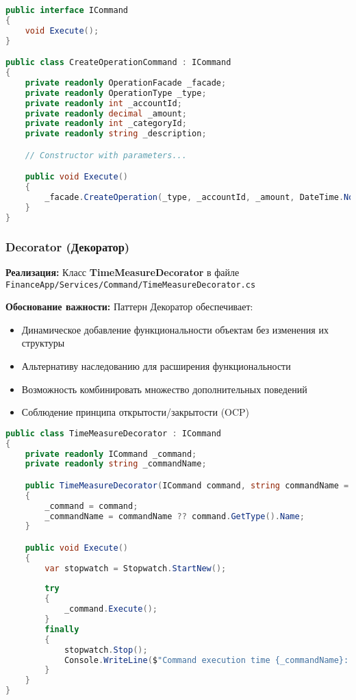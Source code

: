 \documentclass[12pt,a4paper]{article}
\begin{document}
\begin{lstlisting}[language=csharp]
public interface ICommand
{
    void Execute();
}

public class CreateOperationCommand : ICommand
{
    private readonly OperationFacade _facade;
    private readonly OperationType _type;
    private readonly int _accountId;
    private readonly decimal _amount;
    private readonly int _categoryId;
    private readonly string _description;

    // Constructor with parameters...

    public void Execute()
    {
        _facade.CreateOperation(_type, _accountId, _amount, DateTime.Now, _categoryId, _description);
    }
}
\end{lstlisting}

\subsubsection{Decorator (Декоратор)}

\textbf{Реализация:} Класс \textbf{TimeMeasureDecorator} в файле \texttt{FinanceApp/Services/Command/TimeMeasureDecorator.cs}

\textbf{Обоснование важности:} Паттерн Декоратор обеспечивает:
\begin{itemize}
    \item Динамическое добавление функциональности объектам без изменения их структуры
    \item Альтернативу наследованию для расширения функциональности
    \item Возможность комбинировать множество дополнительных поведений
    \item Соблюдение принципа открытости/закрытости (OCP)
\end{itemize}

\begin{lstlisting}[language=csharp]
public class TimeMeasureDecorator : ICommand
{
    private readonly ICommand _command;
    private readonly string _commandName;

    public TimeMeasureDecorator(ICommand command, string commandName = null)
    {
        _command = command;
        _commandName = commandName ?? command.GetType().Name;
    }

    public void Execute()
    {
        var stopwatch = Stopwatch.StartNew();
        
        try
        {
            _command.Execute();
        }
        finally
        {
            stopwatch.Stop();
            Console.WriteLine($"Command execution time {_commandName}: {stopwatch.ElapsedMilliseconds} ms");
        }
    }
}
\end{lstlisting}
\end{document}
